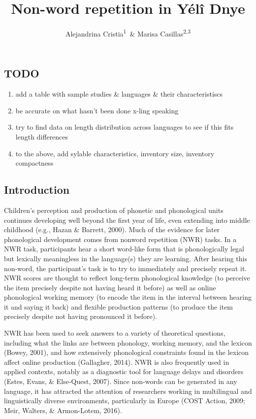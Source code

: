 \documentclass[english,,man,floatsintext]{apa6}
\author{Alejandrina Cristia\textsuperscript{1}\ \& Marisa Casillas\textsuperscript{2,3}}
\affiliation{
\vspace{0.5cm}
\textsuperscript{1} Laboratoire de Sciences Cognitives et de Psycholinguistique, Département d'Etudes cognitives, ENS, EHESS, CNRS, PSL University\\\textsuperscript{2} Max Planck Institute for Psycholinguistics\\\textsuperscript{3} University of Chicago}
\title{Non-word repetition in Yélî Dnye}
\date{}
\providecommand{\tightlist}{%
  \setlength{\itemsep}{0pt}\setlength{\parskip}{0pt}}
\begin{document}
\maketitle

\hypertarget{todo}{%
\subsection{TODO}\label{todo}}

\begin{enumerate}
\def\labelenumi{\arabic{enumi}.}
\tightlist
\item
  add a table with sample studies \& languages \& their characteristiscs
\item
  be accurate on what hasn't been done x-ling speaking
\item
  try to find data on length distribution across languages to see if this fits length differences
\item
  to the above, add sylable characteristics, inventory size, inventory compactness
\end{enumerate}

\hypertarget{introduction}{%
\subsection{Introduction}\label{introduction}}

Children's perception and production of phonetic and phonological units continues developing well beyond the first year of life, even extending into middle childhood (e.g., Hazan \& Barrett, 2000). Much of the evidence for later phonological development comes from nonword repetition (NWR) tasks. In a NWR task, participants hear a short word-like form that is phonologically legal but lexically meaningless in the language(s) they are learning. After hearing this non-word, the participant's task is to try to immediately and precisely repeat it. NWR scores are thought to reflect long-term phonological knowledge (to perceive the item precisely despite not having heard it before) as well as online phonological working memory (to encode the item in the interval between hearing it and saying it back) and flexible production patterns (to produce the item precisely despite not having pronounced it before).

NWR has been used to seek answers to a variety of theoretical questions, including what the links are between phonology, working memory, and the lexicon (Bowey, 2001), and how extensively phonological constraints found in the lexicon affect online production (Gallagher, 2014). NWR is also frequently used in applied contexts, notably as a diagnostic tool for language delays and disorders (Estes, Evans, \& Else-Quest, 2007). Since non-words can be generated in any language, it has attracted the attention of researchers working in multilingual and linguistically diverse environments, particularly in Europe (COST Action, 2009; Meir, Walters, \& Armon-Lotem, 2016).
\end{document}
